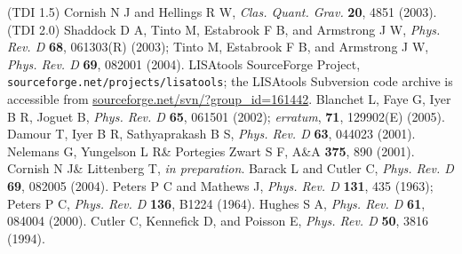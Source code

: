 \documentclass[12pt]{iopart}
\begin{document}
\begin{thebibliography}{10}
 (TDI 1.5) Cornish N J and Hellings R W, \emph{Clas. Quant. Grav.} \textbf{20}, 4851 (2003).
 (TDI 2.0) Shaddock D A, Tinto M, Estabrook F B, and Armstrong J W, \emph{Phys. Rev. D} \textbf{68}, 061303(R) (2003); Tinto M, Estabrook F B, and Armstrong J W, \emph{Phys. Rev. D} \textbf{69}, 082001 (2004).
 LISAtools SourceForge Project, \texttt{sourceforge.net/projects/lisatools}; the LISAtools Subversion code archive is accessible from 
\url{sourceforge.net/svn/?group_id=161442}.
 Blanchet L, Faye G, Iyer B R, Joguet B, \emph{Phys. Rev. D} \textbf{65}, 061501 (2002); \emph{erratum}, \textbf{71}, 129902(E) (2005).
 Damour T, Iyer B R, Sathyaprakash B S, \emph{Phys. Rev. D} \textbf{63}, 044023 (2001).
 Nelemans G, Yungelson L R\& Portegies Zwart S F, A\&A {\bf 375}, 890 (2001).
 Cornish N J\& Littenberg T, {\em in preparation}.
 Barack L and Cutler C, \emph{Phys. Rev. D} {\bf 69}, 082005 (2004).
 Peters P C and Mathews J, \emph{Phys. Rev. D} {\bf 131}, 435 (1963);
 Peters P C, \emph{Phys. Rev. D} {\bf 136}, B1224 (1964).
 Hughes S A, \emph{Phys. Rev. D} {\bf 61}, 084004 (2000).
 Cutler C, Kennefick D, and Poisson E, \emph{Phys. Rev. D} {\bf 50}, 3816 (1994).


\end{thebibliography}
\end{document}
